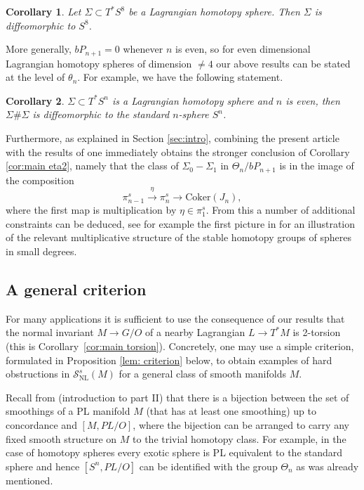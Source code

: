 \documentclass[reqno]{amsart}
\theoremstyle{theorem}
\newtheorem{corollary}{Corollary}[section]
\theoremstyle{remark}
\theoremstyle{definition}
\newcommand{\NL}{\mathrm{NL}}
\renewcommand{\SS}{\mathcal{S}}
\begin{document}
\begin{corollary}
Let $\Sigma \subset T^*S^8$ be a Lagrangian homotopy sphere. Then $\Sigma$ is diffeomorphic to $S^8$.
\end{corollary}

More generally, $bP_{n+1}=0$ whenever $n$ is even, so for even dimensional Lagrangian homotopy spheres of dimension $\neq 4$ our above results can be stated at the level of $\theta_n$. For example, we have the following statement.

\begin{corollary} $\Sigma \subset T^*S^n$ is a Lagrangian homotopy sphere and $n$ is even, then $\Sigma \# \Sigma$ is diffeomorphic to the standard $n$-sphere $S^n$.  \end{corollary}


Furthermore, as explained in Section \ref{sec:intro}, combining the present article with the results of \cite{BW88} one immediately obtains the stronger conclusion of Corollary \ref{cor:main eta2}, namely that the class of $\Sigma_0-\Sigma_1$ in $\Theta_n/bP_{n+1}$ is in the image of the composition
$$ \pi_{n-1}^s \xrightarrow{\eta} \pi_n^s \to \text{Coker}(J_n),$$ where the first map is multiplication by $\eta \in \pi_1^s$. From this a number of additional constraints can be deduced, see for example the first picture in \cite{H} for an illustration of the relevant multiplicative structure of the stable homotopy groups of spheres in small degrees. 




\subsection{A general criterion}


For many applications it is sufficient to use the consequence of our results that the normal invariant $M \to G/O$ of a nearby Lagrangian $L \to T^*M$ is 2-torsion (this is Corollary~\ref{cor:main torsion}). Concretely, one may use a simple criterion, formulated in Proposition \ref{lem: criterion} below, to obtain examples of hard obstructions in $\SS^s_\NL(M)$ for a general class of smooth manifolds $M$.


Recall from \cite{HM74} (introduction to part II) that there is a bijection between the set of smoothings of a PL manifold $M$ (that has at least one smoothing) up to concordance and $[M, PL/O]$, where the bijection can be arranged to carry any fixed smooth structure on $M$ to the trivial homotopy class. For example, in the case of homotopy spheres every exotic sphere is PL equivalent to the standard sphere and hence $[S^n, PL/O]$ can be identified with the group $\Theta_n$ as was already mentioned.
\end{document}

